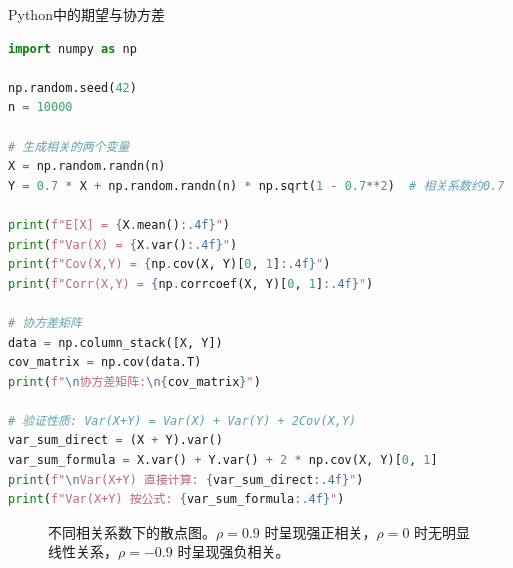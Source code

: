 \begin{mycode}{Python中的期望与协方差}
\begin{lstlisting}[language=Python]
import numpy as np

np.random.seed(42)
n = 10000

# 生成相关的两个变量
X = np.random.randn(n)
Y = 0.7 * X + np.random.randn(n) * np.sqrt(1 - 0.7**2)  # 相关系数约0.7

print(f"E[X] = {X.mean():.4f}")
print(f"Var(X) = {X.var():.4f}")
print(f"Cov(X,Y) = {np.cov(X, Y)[0, 1]:.4f}")
print(f"Corr(X,Y) = {np.corrcoef(X, Y)[0, 1]:.4f}")

# 协方差矩阵
data = np.column_stack([X, Y])
cov_matrix = np.cov(data.T)
print(f"\n协方差矩阵:\n{cov_matrix}")

# 验证性质: Var(X+Y) = Var(X) + Var(Y) + 2Cov(X,Y)
var_sum_direct = (X + Y).var()
var_sum_formula = X.var() + Y.var() + 2 * np.cov(X, Y)[0, 1]
print(f"\nVar(X+Y) 直接计算: {var_sum_direct:.4f}")
print(f"Var(X+Y) 按公式: {var_sum_formula:.4f}")
\end{lstlisting}
\end{mycode}

\begin{figure}[H]
\centering
{}
\caption{不同相关系数下的散点图。$\rho=0.9$ 时呈现强正相关，$\rho=0$ 时无明显线性关系，$\rho=-0.9$ 时呈现强负相关。}
\label{fig:correlation}
\end{figure}

